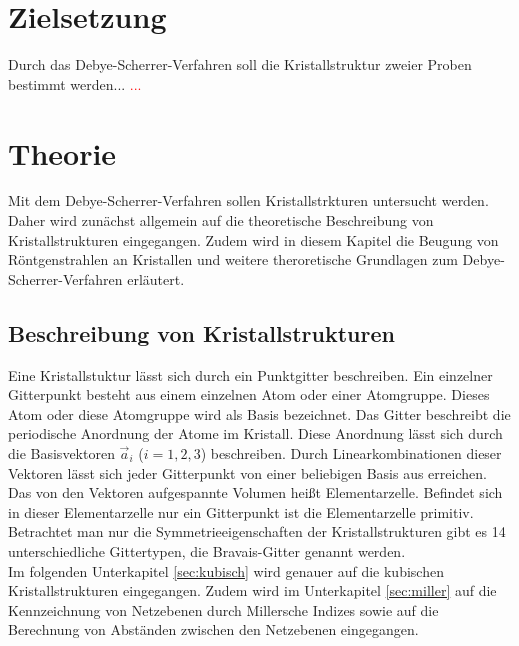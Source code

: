 \section{Zielsetzung}
Durch das Debye-Scherrer-Verfahren soll die Kristallstruktur zweier Proben bestimmt werden...
\textcolor{red}{...}
\section{Theorie}
Mit dem Debye-Scherrer-Verfahren sollen Kristallstrkturen untersucht werden.
Daher wird zunächst allgemein auf die theoretische Beschreibung von Kristallstrukturen eingegangen.
Zudem wird in diesem Kapitel die Beugung von Röntgenstrahlen an Kristallen und weitere theroretische Grundlagen zum Debye-Scherrer-Verfahren erläutert.

\subsection{Beschreibung von Kristallstrukturen}
Eine Kristallstuktur lässt sich durch ein Punktgitter beschreiben.
Ein einzelner Gitterpunkt besteht aus einem einzelnen Atom oder einer Atomgruppe.
Dieses Atom oder diese Atomgruppe wird als Basis bezeichnet.
Das Gitter beschreibt die periodische Anordnung der Atome im Kristall.
Diese Anordnung lässt sich durch die Basisvektoren $\vec a_i$ ($i=1,2,3$) beschreiben.
Durch Linearkombinationen dieser Vektoren lässt sich jeder Gitterpunkt von einer beliebigen Basis aus erreichen.\\
Das von den Vektoren aufgespannte Volumen heißt Elementarzelle.
Befindet sich in dieser Elementarzelle nur ein Gitterpunkt ist die Elementarzelle primitiv.
Betrachtet man nur die Symmetrieeigenschaften der Kristallstrukturen gibt es 14 unterschiedliche Gittertypen, die Bravais-Gitter genannt werden.\\
Im folgenden Unterkapitel \ref{sec:kubisch} wird genauer auf die kubischen Kristallstrukturen eingegangen.
Zudem wird im Unterkapitel \ref{sec:miller} auf die Kennzeichnung von Netzebenen durch Millersche Indizes sowie auf die Berechnung von Abständen zwischen den Netzebenen eingegangen.

